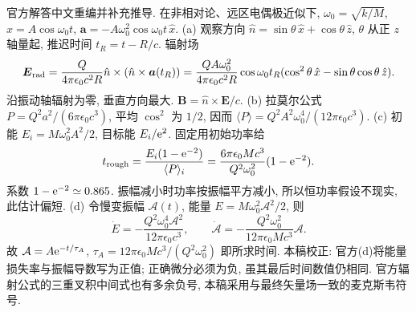 \begin{solution}
官方解答中文重编并补充推导. 在非相对论、远区电偶极近似下, $\omega_0=\sqrt{k/M}$, $x=A\cos\omega_0t$, $\boldsymbol a=-A\omega_0^2\cos\omega_0t\,\hat x$. (a) 观察方向 $\hat n=\sin\theta\,\hat x+\cos\theta\,\hat z$, $\theta$ 从正 $z$ 轴量起, 推迟时间 $t_R=t-R/c$. 辐射场
\[
\boldsymbol E_{\rm rad}=\frac{Q}{4\pi\epsilon_0c^2R}\hat n\times(\hat n\times\boldsymbol a(t_R))
=\frac{QA\omega_0^2}{4\pi\epsilon_0c^2R}\cos\omega_0t_R
(\cos^2\theta\,\hat x-\sin\theta\cos\theta\,\hat z).
\]
沿振动轴辐射为零, 垂直方向最大. $\boldsymbol B=\hat n\times\boldsymbol E/c$.
(b) 拉莫尔公式 $P=Q^2a^2/(6\pi\epsilon_0c^3)$, 平均 $\cos^2$ 为 $1/2$, 因而 $\langle P\rangle=Q^2A^2\omega_0^4/(12\pi\epsilon_0c^3)$.
(c) 初能 $E_i=M\omega_0^2A^2/2$, 目标能 $E_i/\mathrm e^2$. 固定用初始功率给
\[
t_{\rm rough}=\frac{E_i(1-\mathrm e^{-2})}{\langle P\rangle_i}
=\frac{6\pi\epsilon_0Mc^3}{Q^2\omega_0^2}(1-\mathrm e^{-2}).
\]
系数 $1-\mathrm e^{-2}\simeq0.865$. 振幅减小时功率按振幅平方减小, 所以恒功率假设不现实, 此估计偏短.
(d) 令慢变振幅 $\mathcal A(t)$, 能量 $E=M\omega_0^2\mathcal A^2/2$, 则
\[
\dot E=-\frac{Q^2\omega_0^4\mathcal A^2}{12\pi\epsilon_0c^3},\qquad
\dot{\mathcal A}=-\frac{Q^2\omega_0^2}{12\pi\epsilon_0Mc^3}\mathcal A.
\]
故 $\mathcal A=A\mathrm e^{-t/\tau_A}$, $\tau_A=12\pi\epsilon_0Mc^3/(Q^2\omega_0^2)$ 即所求时间. 本稿校正: 官方(d)将能量损失率与振幅导数写为正值; 正确微分必须为负, 虽其最后时间数值仍相同. 官方辐射公式的三重叉积中间式也有多余负号, 本稿采用与最终矢量场一致的麦克斯韦符号.
\end{solution}
